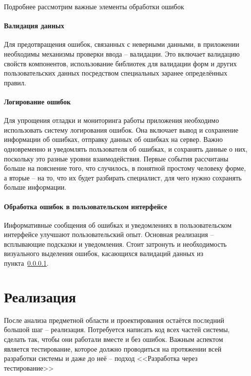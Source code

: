 \documentclass[a4paper,article]{article}
\begin{document}
    Подробнее рассмотрим важные элементы обработки ошибок

    \paragraph{Валидация данных}\label{Проектирование клиента. Валидация данных}

    Для предотвращения ошибок, связанных с неверными данными, в приложении необходимы механизмы проверки ввода -- валидации. Это включает валидацию свойств компонентов, использование библиотек для валидации форм и других пользовательских данных посредством специальных заранее определённых правил.

    \paragraph{Логирование ошибок}

    Для упрощения отладки и мониторинга работы приложения необходимо использовать систему логирования ошибок. Она включает вывод и сохранение информации об ошибках, отправку данных об ошибках на сервер. Важно одновременно и уведомлять пользователя об ошибках, и сохранять данные о них, поскольку это разные уровни взаимодействия. Первые события рассчитаны больше на пояснение того, что случилось, в понятной простому человеку форме, а вторые -- на то, что их будет разбирать специалист, для чего нужно сохранять больше информации.

    \paragraph{Обработка ошибок в пользовательском интерфейсе}

    Информативные сообщения об ошибках и уведомлениях в пользовательском интерфейсе улучшают пользовательский опыт. Основная реализация -- всплывающие подсказки и уведомления. Стоит затронуть и необходимость визуального выделения ошибок, касающихся валидаций данных из пункта~\ref{Проектирование клиента. Валидация данных}.

    \newpage

    \section{Реализация}\label{Реализация}

    После анализа предметной области и проектирования остаётся последний большой шаг -- реализация. Потребуется написать код всех частей системы, сделать так, чтобы они работали вместе и без ошибок. Важным аспектом является тестирование, которое должно проводиться на протяжении всей разработки системы и даже до неё -- подход <<Разработка через тестирование>>
\end{document}
